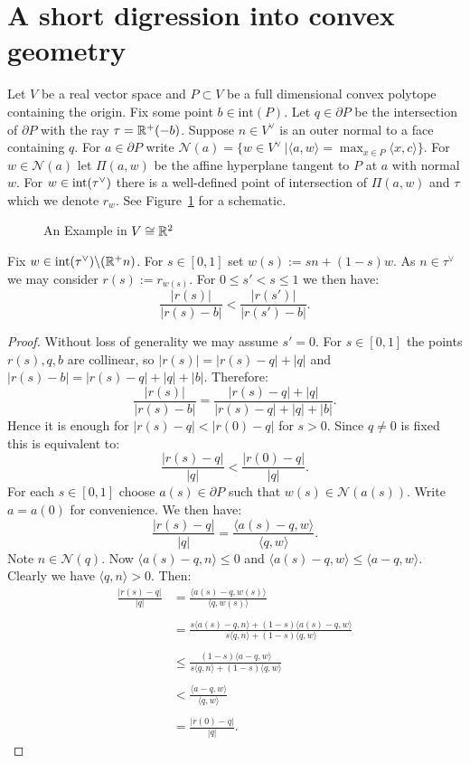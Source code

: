 \section{A short digression into convex geometry}
Let \(V\) be a real vector space and \(P \subset V\) be a full dimensional convex polytope containing the origin. Fix some point \(b \in \text{int}(P)\). Let \(q \in \partial P\) be the intersection of \(\partial P\) with the ray \(\tau = \mathbb{R}^+ (-b)\). Suppose \(n \in V^\vee\) is an outer normal to a face containing \(q\). For \(a \in \partial P\) write \(\mathcal{N}(a) = \{w\in V^\vee \ | \langle a,w \rangle = \max_{x \in P} \langle x,c \rangle \}\). For \(w \in \mathcal{N}(a) \) let \(\Pi(a,w)\) be the affine hyperplane tangent to \(P\) at \(a\) with normal \(w\). For \(w \in \text{int}(\tau^\vee) \) there is a well-defined point of intersection of \(\Pi(a,w)\) and \(\tau\) which we denote \(r_w\). See Figure~\ref{schematic} for a schematic.
\begin{figure}[h] \centering
{}
\caption{An Example in \(V \cong \mathbb{R}^2\)}
\label{schematic}
\end{figure}
\begin{lemma} \label{R(X):Lemma3.1}
Fix \(w \in \text{int}(\tau^\vee) \backslash (\mathbb{R}^+ n)\). For \(s \in [0,1]\) set \(w(s) := sn + (1-s)w\). As \(n \in \tau^\vee \) we may consider \(r(s) := r_{w(s)}\). For \(0 \le s' < s \le 1\) we then have:
\[
\frac{|r(s)|}{|r(s)-b|} < \frac{|r(s')|}{|r(s')-b|}.
\]
\end{lemma}
\begin{proof}
Without loss of generality we may assume \(s' = 0\). For \(s \in [0,1]\) the points \(r(s), q,b\) are collinear, so \(|r(s)|= |r(s)-q|+|q|\) and \(|r(s)-b| =|r(s)-q| +|q| + |b| \). Therefore:
\[
\frac{|r(s)|}{|r(s) - b|} = \frac{|r(s)-q|+|q|}{|r(s)-q| +|q| + |b|}.
\]
Hence it is enough for \(|r(s)-q| < |r(0)-q|\) for \(s >0\). Since \(q \neq 0\) is fixed this is equivalent to:
\[
\frac{|r(s) - q|}{|q|} < \frac{|r(0) - q|}{|q|}.
\]
For each \(s \in [0,1]\) choose \(a(s) \in \partial P\) such that \(w(s) \in \mathcal{N}(a(s))\). Write \(a = a(0)\) for convenience. We then have:
\[
\frac{|r(s)-q|}{|q|} = \frac{\langle a(s)-q, w \rangle }{\langle q,w \rangle}.
\]
Note \(n \in \mathcal{N}(q)\). Now \(\langle a(s)-q,n \rangle \le 0\)  and \( \langle a(s) - q,w \rangle \le \langle a - q,w \rangle\). Clearly we have \(\langle q , n \rangle > 0\). Then:
\begin{align*}
\frac{|r(s)-q|}{|q|}  &= \frac{\langle a(s) - q, w(s) \rangle }{\langle q, w(s) \rangle} \\ \\ &= \frac{s\langle a(s)-q, n \rangle + (1-s)\langle a(s)-q,w \rangle}{s \langle q , n \rangle + (1-s) \langle q, w \rangle} \\ \\ &\le \frac{(1-s)\langle a-q, w \rangle }{s \langle q , n \rangle + (1-s) \langle q, w \rangle} \\ \\ &< \frac{\langle a-q, w \rangle }{\langle q,w \rangle} \\ \\ &= \frac{|r(0) - q|}{|q|}.
\end{align*}
\end{proof}
